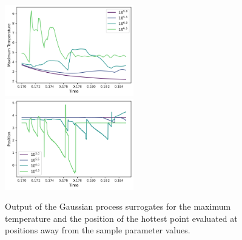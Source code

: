 \begin{figure}[tbp]
\includegraphics[width=0.5\textwidth]{gp_sample_max_temp.png}
\includegraphics[width=0.5\textwidth]{gp_sample_position.png}
\caption{%
Output of the Gaussian process surrogates for the maximum temperature and the position of the hottest point evaluated at positions away from the sample parameter values.  
\label{fig:GPoutputs}
}
\end{figure}








